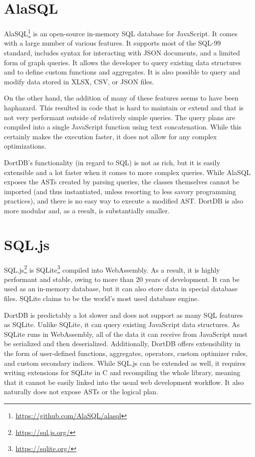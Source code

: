 \section{AlaSQL}

AlaSQL\footnote{\url{https://github.com/AlaSQL/alasql}} is an open-source in-memory SQL database for JavaScript. It comes with a large number of various features. It supports most of the SQL-99 standard, includes syntax for interacting with JSON documents, and a limited form of graph queries. It allows the developer to query existing data structures and to define custom functions and aggregates. It is also possible to query and modify data stored in XLSX, CSV, or JSON files.

On the other hand, the addition of many of these features seems to have been haphazard. This resulted in code that is hard to maintain or extend and that is not very performant outside of relatively simple queries. The query plans are compiled into a single JavaScript function using text concatenation. While this certainly makes the execution faster, it does not allow for any complex optimizations.

DortDB's functionality (in regard to SQL) is not as rich, but it is easily extensible and a lot faster when it comes to more complex queries. While AlaSQL exposes the ASTs created by parsing queries, the classes themselves cannot be imported (and thus instantiated, unless resorting to less savory programming practices), and there is no easy way to execute a modified AST. DortDB is also more modular and, as a result, is substantially smaller.

\section{SQL.js}

SQL.js\footnote{\url{https://sql.js.org/}} is SQLite\footnote{\url{https://sqlite.org/}} compiled into WebAssembly. As a result, it is highly performant and stable, owing to more than 20 years of development. It can be used as an in-memory database, but it can also store data in special database files. SQLite claims to be the world's most used database engine.

DortDB is predictably a lot slower and does not support as many SQL features as SQLite. Unlike SQLite, it can query existing JavaScript data structures. As SQLite runs in WebAssembly, all of the data it can receive from JavaScript must be serialized and then deserialized. Additionally, DortDB offers extensibility in the form of user-defined functions, aggregates, operators, custom optimizer rules, and custom secondary indices. While SQL.js can be extended as well, it requires writing extensions for SQLite in C and recompiling the whole library, meaning that it cannot be easily linked into the usual web development workflow. It also naturally does not expose ASTs or the logical plan.